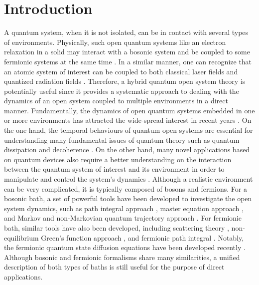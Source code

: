 \documentclass[preprint]{elsarticle}
\begin{document}
\nolinenumbers
\section{Introduction}

A quantum system, when it is not isolated,  can be in contact
with several types of environments.  Physically, such open quantum systems  like an electron relaxation in
a solid may interact with a bosonic system and be coupled to
some fermionic systems at the same time \cite{hybrid1,hybrid2,hybrid3}.  In a similar manner, one can recognize 
that an atomic system of interest can be coupled to both classical laser fields and quantized radiation fields \cite{Gardiner1}.  
Therefore, a hybrid quantum 
open system theory is potentially useful since it provides a systematic 
approach to dealing with the dynamics of an open system coupled to multiple environments in a direct manner.
Fundamentally, the dynamics of open quantum systems
embedded in one or more environments has attracted
the wide-spread interest in recent years \cite{Unrhu,Breuer,Xinyu2011,Nlevel}. On the one hand,
the temporal behaviours of quantum open systems are essential for understanding many fundamental
issues of quantum theory such as quantum dissipation and decoherence \cite{Deco1,Deco2,Deco3,Deco4,Yu-Eberly04,Nqubit,Ncavity}.
On the other hand, many novel applications based on quantum devices
also require a better understanding on the interaction between the quantum
system of interest and its environment in order to manipulate and control the system's dynamics \cite{DD,FBC}.
Although a realistic environment can be very complicated, it is typically composed of bosons and fermions. For a bosonic bath, a set
of powerful tools have been developed to investigate the open system
dynamics, such as path integral approach \cite{Feynman-Vernon,ZhangWM-2cav},
master equation approach \cite{H-P-Z,Hu1,Hu2,Leggett}, and Markov and non-Markovian
quantum trajectory approach \cite{Gisin-Percival,Dalibardetal,QSD,Yu1999,YuQBM}. For
fermionic bath, similar tools have also been developed, including
scattering theory \cite{scattering}, non-equilibrium Green's function
approach \cite{NEGF}, and fermionic path integral \cite{ZhangDQD,Zhang2012PRL}. 
Notably, the fermionic quantum state diffusion equations have been developed recently 
\cite{ZhaoFB,ShiFB,ChenFB}.  Although bosonic and fermionic formalisms  share many
similarities, a unified description of both types
of baths is still useful for the purpose of direct applications.
\end{document}

